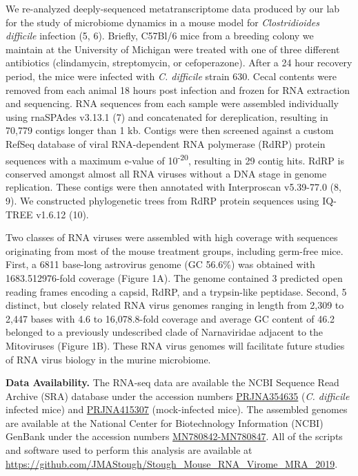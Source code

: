 \documentclass[11pt,]{article}
\begin{document}
We re-analyzed deeply-sequenced metatranscriptome data produced by our
lab for the study of microbiome dynamics in a mouse model for
\emph{Clostridioides difficile} infection (5, 6). Briefly, C57Bl/6 mice
from a breeding colony we maintain at the University of Michigan were
treated with one of three different antibiotics (clindamycin,
streptomycin, or cefoperazone). After a 24 hour recovery period, the
mice were infected with \emph{C. difficile} strain 630. Cecal contents
were removed from each animal 18 hours post infection and frozen for RNA
extraction and sequencing. RNA sequences from each sample were assembled
individually using rnaSPAdes v3.13.1 (7) and concatenated for
dereplication, resulting in 70,779 contigs longer than 1 kb. Contigs
were then screened against a custom RefSeq database of viral
RNA-dependent RNA polymerase (RdRP) protein sequences with a maximum
e-value of 10\textsuperscript{-20}, resulting in 29 contig hits. RdRP is
conserved amongst almost all RNA viruses without a DNA stage in genome
replication. These contigs were then annotated with Interproscan
v5.39-77.0 (8, 9). We constructed phylogenetic trees from RdRP protein
sequences using IQ-TREE v1.6.12 (10).

Two classes of RNA viruses were assembled with high coverage with
sequences originating from most of the mouse treatment groups, including
germ-free mice. First, a 6811 base-long astrovirus genome (GC 56.6\%)
was obtained with 1683.512976-fold coverage (Figure 1A). The genome
contained 3 predicted open reading frames encoding a capsid, RdRP, and a
trypsin-like peptidase. Second, 5 distinct, but closely related RNA
virus genomes ranging in length from 2,309 to 2,447 bases with 4.6 to
16,078.8-fold coverage and average GC content of 46.2 belonged to a
previously undescribed clade of Narnaviridae adjacent to the Mitoviruses
(Figure 1B). These RNA virus genomes will facilitate future studies of
RNA virus biology in the murine microbiome.

\textbf{Data Availability.} The RNA-seq data are available the NCBI
Sequence Read Archive (SRA) database under the accession numbers
\href{https://www.ncbi.nlm.nih.gov/bioproject/354635}{PRJNA354635}
(\emph{C. difficile} infected mice) and
\href{https://www.ncbi.nlm.nih.gov/bioproject/415307}{PRJNA415307}
(mock-infected mice). The assembled genomes are available at the
National Center for Biotechnology Information (NCBI) GenBank under the
accession numbers \href{}{MN780842-MN780847}. All of the scripts and
software used to perform this analysis are available at
\url{https://github.com/JMAStough/Stough_Mouse_RNA_Virome_MRA_2019}.
\end{document}
